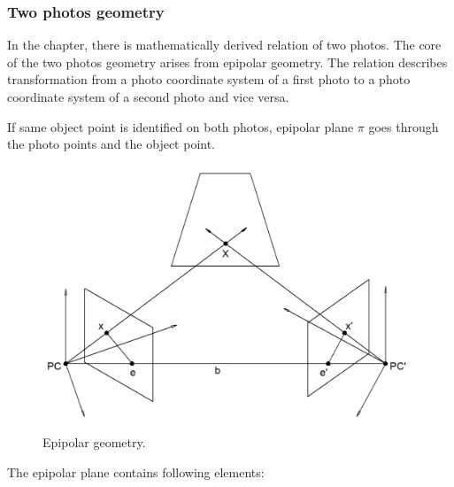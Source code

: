 \documentclass[a4paper,12pt]{article}
\begin{document}
\subsubsection{Two photos geometry}



In the chapter, there is mathematically derived relation of two photos.
The core of the two photos geometry arises from epipolar geometry.
The relation describes transformation from a photo coordinate system of a first photo to 
a photo coordinate system of a second photo and vice versa.

If same object point is identified on both photos,  
epipolar plane $\pi$ goes through the photo points and the object point. 

\begin{figure}[h]
    \centering
    \includegraphics[scale=0.3]{figures/epipolar.png}
    \caption{Epipolar geometry.}
    \label{fig:epipolae}
\end{figure}

The epipolar plane contains following elements:

\end{document}

